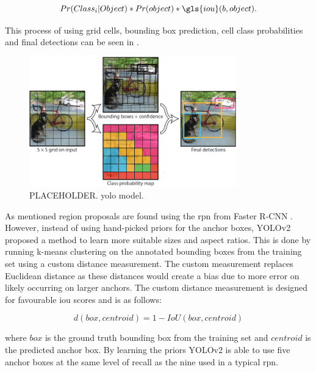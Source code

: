 \begin{equation}
  Pr(Class_i \rvert Object) *  Pr(object) * \gls{iou}(b, object). 
\end{equation}

This process of using grid cells, bounding box prediction, cell class probabilities and final detections can be seen in .

\begin{figure}[H]
  \centering
    \includegraphics[width=0.8\textwidth]{Figs/Techanal/yolomodel.png}
      \caption{PLACEHOLDER. \gls{yolo} model.}
    \label{fig:yolomodel}
\end{figure}

As mentioned region proposals are found using the \gls{rpn} from Faster R-CNN \cite{fasterrcnn}. However, instead of using hand-picked priors for the anchor boxes, YOLOv2 proposed a method to learn more suitable sizes and aspect ratios. This is done by running k-means clustering on the annotated bounding boxes from the training set using a custom distance measurement. The custom measurement replaces Euclidean distance as these distances would create a bias due to more error on likely occurring on larger anchors. The custom distance measurement is designed for favourable \gls{iou} scores and is as follows:

\begin{equation}
  d(box, centroid) = 1 - IoU(box, centroid)
\end{equation}

where $box$ is the ground truth bounding box from the training set and $centroid$ is the predicted anchor box. By learning the priors YOLOv2 is able to use five anchor boxes at the same level of recall as the nine used in a typical \gls{rpn}.

